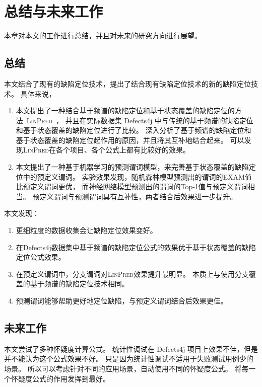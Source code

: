 \chapter{总结与未来工作}

本章对本文的工作进行总结，并且对未来的研究方向进行展望。

\section{总结}

本文结合了现有的缺陷定位技术，提出了结合现有缺陷定位技术的新的缺陷定位技术。
具体来说，
\begin{enumerate}
\item 本文提出了一种结合基于频谱的缺陷定位和基于状态覆盖的缺陷定位的方法~\textsc{LinPred}~，
并且在实际数据集 Defects4j 中与传统的基于频谱的缺陷定位和基于状态覆盖的缺陷定位进行了比较。
深入分析了基于频谱的缺陷定位和基于状态覆盖的缺陷定位起作用的原因，并且将其互补地结合起来。
可以发现\textsc{LinPred}在各个项目、各个公式上都有比较好的效果。
\item 本文提出了一种基于机器学习的预测谓词模型，来完善基于状态覆盖的缺陷定位中的预定义谓词。
实验效果发现，随机森林模型预测出的谓词的EXAM值比预定义谓词更优，
而神经网络模型预测出的谓词的Top-1值与预定义谓词相当。
预定义谓词与预测谓词具有互补性，两者结合后效果进一步提升。
\end{enumerate}

本文发现：
\begin{enumerate}
\item 更细粒度的数据收集会让缺陷定位效果变好。
\item 在Defects4j数据集中基于频谱的缺陷定位公式的效果优于基于状态覆盖的缺陷定位公式效果。
\item 在预定义谓词中，分支谓词对\textsc{LinPred}效果提升最明显。
本质上与使用分支覆盖的基于频谱的缺陷定位技术相同。
\item 预测谓词能够帮助更好地定位缺陷，与预定义谓词结合后效果更佳。
\end{enumerate}

\section{未来工作}

本文尝试了多种怀疑度计算公式。
统计性调试在 Defects4j 项目上效果不佳，但是并不能认为这个公式效果不好。
只是因为统计性调试不适用于失败测试用例少的场景。
所以可以考虑针对不同的应用场景，自动使用不同的怀疑度公式。
将每一个怀疑度公式的作用发挥到最好。

